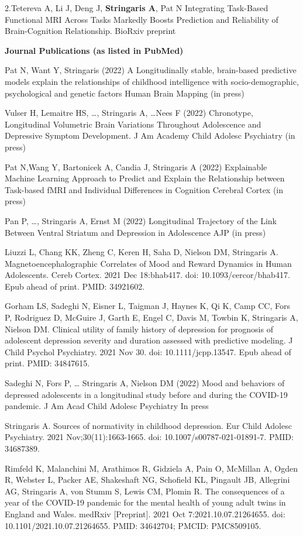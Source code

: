 \documentclass[
]{article}
\begin{document}
2.Tetereva A, Li J, Deng J, \textbf{Stringaris A}, Pat N Integrating
Task-Based Functional MRI Across Tasks Markedly Boosts Prediction and
Reliability of Brain-Cognition Relationship. BioRxiv preprint

\textbf{Journal Publications (as listed in PubMed)}

Pat N, Want Y, Stringaris (2022) A Longitudinally stable, brain-based
predictive models explain the relationships of childhood intelligence
with socio-demographic, psychological and genetic factors Human Brain
Mapping (in press)

Vulser H, Lemaitre HS, \ldots, Stringaris A, \ldots Nees F (2022)
Chronotype, Longitudinal Volumetric Brain Variations Throughout
Adolescence and Depressive Symptom Development. J Am Academy Child
Adolesc Psychiatry (in press)

Pat N,Wang Y, Bartonicek A, Candia J, Stringaris A (2022) Explainable
Machine Learning Approach to Predict and Explain the Relationship
between Task-based fMRI and Individual Differences in Cognition Cerebral
Cortex (in press)

Pan P, \ldots, Stringaris A, Ernst M (2022) Longitudinal Trajectory of
the Link Between Ventral Striatum and Depression in Adolescence AJP (in
press)

Liuzzi L, Chang KK, Zheng C, Keren H, Saha D, Nielson DM, Stringaris A.
Magnetoencephalographic Correlates of Mood and Reward Dynamics in Human
Adolescents. Cereb Cortex. 2021 Dec 18:bhab417. doi:
10.1093/cercor/bhab417. Epub ahead of print. PMID: 34921602.

Gorham LS, Sadeghi N, Eisner L, Taigman J, Haynes K, Qi K, Camp CC, Fors
P, Rodriguez D, McGuire J, Garth E, Engel C, Davis M, Towbin K,
Stringaris A, Nielson DM. Clinical utility of family history of
depression for prognosis of adolescent depression severity and duration
assessed with predictive modeling. J Child Psychol Psychiatry. 2021 Nov
30. doi: 10.1111/jcpp.13547. Epub ahead of print. PMID: 34847615.

Sadeghi N, Fors P, \ldots{} Stringaris A, Nielson DM (2022) Mood and
behaviors of depressed adolescents in a longitudinal study before and
during the COVID-19 pandemic. J Am Acad Child Adolesc Psychiatry In
press

Stringaris A. Sources of normativity in childhood depression. Eur Child
Adolesc Psychiatry. 2021 Nov;30(11):1663-1665. doi:
10.1007/s00787-021-01891-7. PMID: 34687389.

Rimfeld K, Malanchini M, Arathimos R, Gidziela A, Pain O, McMillan A,
Ogden R, Webster L, Packer AE, Shakeshaft NG, Schofield KL, Pingault JB,
Allegrini AG, Stringaris A, von Stumm S, Lewis CM, Plomin R. The
consequences of a year of the COVID-19 pandemic for the mental health of
young adult twins in England and Wales. medRxiv {[}Preprint{]}. 2021 Oct
7:2021.10.07.21264655. doi: 10.1101/2021.10.07.21264655. PMID: 34642704;
PMCID: PMC8509105.
\end{document}
